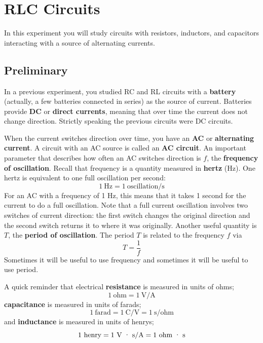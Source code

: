 \setcounter{chapter}{5}
\chapter{RLC Circuits}
%
In this experiment you will study circuits with resistors, inductors, and capacitors interacting with a source of alternating currents.
%
\section{Preliminary}
%
In a previous experiment, you studied RC and RL circuits with a \textbf{battery} (actually, a few batteries connected in series) as the source of current. Batteries provide \textbf{DC} or \textbf{direct currents}, meaning that over time the current does not change direction. Strictly speaking the previous circuits were DC circuits.

When the current switches direction over time, you have an \textbf{AC} or \textbf{alternating current}. A circuit with an AC source is called an \textbf{AC circuit}. An important parameter that describes how often an AC switches direction is $f$, the \textbf{frequency of oscillation}. Recall that frequency is a quantity measured in \textbf{hertz} (Hz). One hertz is equivalent to one full oscillation per second:
\begin{equation}
	1 \ \text{Hz} = 1 \ \text{oscillation/s}
\end{equation}
For an AC with a frequency of 1 Hz, this means that it takes 1 second for the current to do a full oscillation. Note that a full current oscillation involves two switches of current direction: the first switch changes the original direction and the second switch returns it to where it was originally. Another useful quantity is $T$, the \textbf{period of oscillation}. The period $T$ is related to the frequency $f$ via
\begin{equation} \label{eq.06.period}
	T = \frac{1}{f}
\end{equation}
Sometimes it will be useful to use frequency and sometimes it will be useful to use period.

A quick reminder that electrical \textbf{resistance} is measured in units of ohms;
\begin{equation}
	1 \ \text{ohm} = 1 \ \text{V/A}
\end{equation}
\textbf{capacitance} is measured in units of farads;
\begin{equation}
	1 \ \text{farad} = 1 \ \text{C/V} = 1 \ \text{s/ohm}
\end{equation}
and \textbf{inductance} is measured in units of henrys;
\begin{equation}
	1 \ \text{henry} = 1 \ \text{V{ }\textperiodcentered{ }s/A} = 1 \ \text{ohm{ }\textperiodcentered{ }s}
\end{equation}
%
